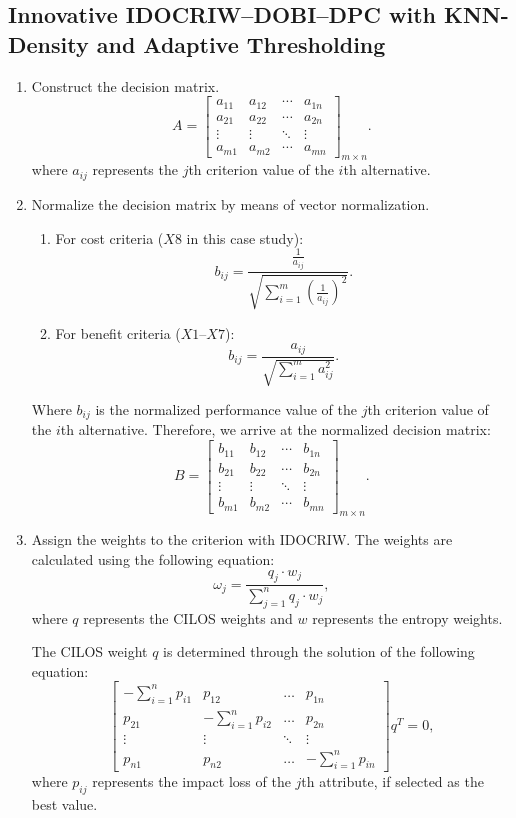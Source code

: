 \documentclass{article}
\begin{document}
\subsection{Innovative IDOCRIW--DOBI--DPC with KNN-Density and Adaptive Thresholding}
\begin{enumerate}[label=\textbf{Step}~\arabic*.]
\item Construct the decision matrix.
\[
A=
\begin{bmatrix}
a_{11} & a_{12} & \cdots & a_{1n} \\
a_{21} & a_{22} & \cdots & a_{2n} \\
\vdots & \vdots & \ddots & \vdots \\
a_{m1} & a_{m2} & \cdots & a_{mn}
\end{bmatrix}_{m \times n}.
\]
where $a_{ij}$ represents the $j$th criterion value of the $i$th alternative.

\item Normalize the decision matrix by means of vector normalization.
\begin{enumerate}[label=(\alph*)]
\item For cost criteria ($X8$ in this case study):
\[
b_{ij} = \frac{\frac{1}{a_{ij}}}{\sqrt{\sum_{i=1}^{m} (\frac{1}{a_{ij}})^{2}}}.
\]
\item For benefit criteria ($X1$--$X7$):
\[
b_{ij} = \frac{a_{ij}}{\sqrt{\sum_{i=1}^{m} a_{ij}^{2}}}.
\]
\end{enumerate}
Where $b_{ij}$ is the normalized performance value of the $j$th criterion value of the $i$th alternative. Therefore, we arrive at the normalized decision matrix:
\[
B=
\begin{bmatrix}
b_{11} & b_{12} & \cdots & b_{1n} \\
b_{21} & b_{22} & \cdots & b_{2n} \\
\vdots & \vdots & \ddots & \vdots \\
b_{m1} & b_{m2} & \cdots & b_{mn}
\end{bmatrix}_{m \times n}.
\]

\item Assign the weights to the criterion with IDOCRIW.
The weights are calculated using the following equation:
\[
\omega_{j} = \frac{q_{j} \cdot w_{j}}{\sum_{j=1}^{n} q_{j} \cdot w_{j}},
\]
where $q$ represents the CILOS weights and $w$ represents the entropy weights.

The CILOS weight $q$ is determined through the solution of the following equation:
\[
\begin{bmatrix}
-\sum_{i=1}^{n} p_{i1} & p_{12} & \ldots & p_{1n} \\
p_{21} & -\sum_{i=1}^{n} p_{i2} & \ldots & p_{2n} \\
\vdots & \vdots & \ddots & \vdots \\
p_{n1} & p_{n2} & \ldots & -\sum_{i=1}^{n} p_{in}
\end{bmatrix}
q^{T} = 0,
\]
where $p_{ij}$ represents the impact loss of the $j$th attribute, if selected as the best value.


\end{enumerate}
\end{document}
